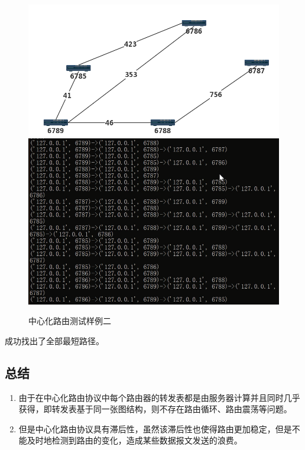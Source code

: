 		\begin{figure}[H]
			\centering
			\includegraphics[scale=0.4]{imgs/topo3/topo2.png}
			\includegraphics[scale=1]{imgs/cenTest2.PNG}
			\caption{中心化路由测试样例二}
			\label{fig:CentralizedTest2}
		\end{figure}
		成功找出了全部最短路径。
	\subsection{总结} %
	\label{sub:总结}
		\begin{enumerate}
			\item 由于在中心化路由协议中每个路由器的转发表都是由服务器计算并且同时几乎获得，即转发表基于同一张图结构，则不存在路由循环、路由震荡等问题。
			\item 但是中心化路由协议具有滞后性，虽然该滞后性也使得路由更加稳定，但是不能及时地检测到路由的变化，造成某些数据报文发送的浪费。
		\end{enumerate}
